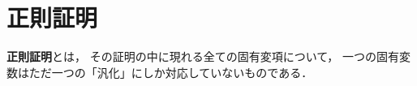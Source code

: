 \section{正則証明}
	
	\begin{screen}
		\begin{metadfn}[正則証明]
			{\bf 正則証明}とは，
			その証明の中に現れる全ての固有変項について，
			一つの固有変数はただ一つの「汎化」にしか対応していないものである．
		\end{metadfn}
	\end{screen}
	
	\begin{screen}
		\begin{metathm}[どんな証明も正則化できる]
			
		\end{metathm}
	\end{screen}
	
